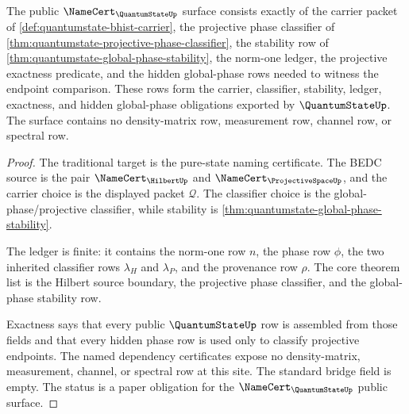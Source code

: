 \begin{theorem}
\label{thm:quantumstate-namecert-obligation-surface}
\label{thm:quantumstate-projective-consumer-boundary}
The public $\NameCert_{\QuantumStateUp}$ surface consists exactly of the
carrier packet of \autoref{def:quantumstate-bhist-carrier}, the projective
phase classifier of \autoref{thm:quantumstate-projective-phase-classifier}, the
stability row of \autoref{thm:quantumstate-global-phase-stability}, the
norm-one ledger, the projective exactness predicate, and the hidden
global-phase rows needed to witness the endpoint comparison. These rows form
the carrier, classifier, stability, ledger, exactness, and hidden
global-phase obligations exported by $\QuantumStateUp$. The surface contains
no density-matrix row, measurement row, channel row, or spectral row.
\end{theorem}
\begin{proof}
The traditional target is the pure-state naming certificate. The BEDC source
is the pair $\NameCert_{\HilbertUp}$ and $\NameCert_{\ProjectiveSpaceUp}$, and
the carrier choice is the displayed packet $\mathcal{Q}$. The classifier choice
is the global-phase/projective classifier, while stability is
\autoref{thm:quantumstate-global-phase-stability}.

The ledger is finite: it contains the norm-one row $n$, the phase row $\phi$,
the two inherited classifier rows $\lambda_H$ and $\lambda_P$, and the
provenance row $\rho$. The core theorem list is the Hilbert source boundary,
the projective phase classifier, and the global-phase stability row.

Exactness says that every public $\QuantumStateUp$ row is assembled from those
fields and that every hidden phase row is used only to classify projective
endpoints. The named dependency certificates expose no density-matrix,
measurement, channel, or spectral row at this site. The standard bridge field
is empty. The status is a paper obligation for the $\NameCert_{\QuantumStateUp}$
public surface.
\end{proof}

